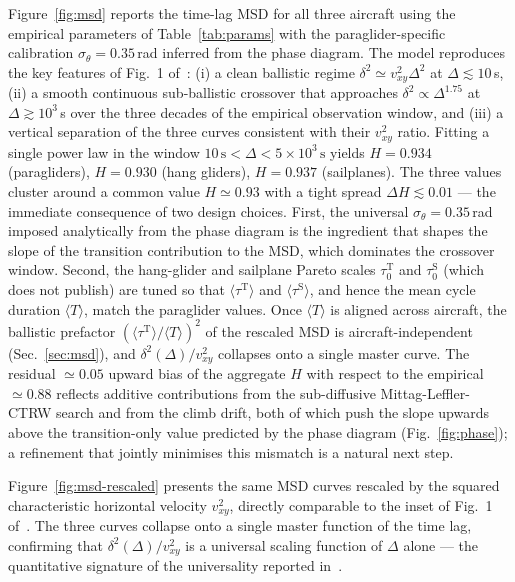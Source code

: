 \documentclass[11pt,a4paper]{article}
\begin{document}
Figure~\ref{fig:msd} reports the time-lag MSD for all three
aircraft using the empirical parameters of Table~\ref{tab:params}
with the paraglider-specific calibration $\sigma_\theta = 0.35$\,rad
inferred from the phase diagram. The model reproduces the key
features of Fig.~1 of~\cite{vilpellet2026}: (i) a clean ballistic
regime $\delta^2 \simeq v_{xy}^2\Delta^2$ at $\Delta \lesssim
10$\,s, (ii) a smooth continuous sub-ballistic crossover that
approaches $\delta^2 \propto \Delta^{1.75}$ at $\Delta \gtrsim
10^3$\,s over the three decades of the empirical observation
window, and (iii) a vertical separation of the three curves
consistent with their $v_{xy}^2$ ratio. Fitting a single power law
in the window $10\,\mathrm{s} < \Delta < 5 \times 10^3\,\mathrm{s}$
yields $H = 0.934$ (paragliders), $H = 0.930$ (hang gliders),
$H = 0.937$ (sailplanes). The three values cluster around a
common value $H \simeq 0.93$ with a tight spread $\Delta H
\lesssim 0.01$ --- the immediate consequence of two design
choices. First, the universal $\sigma_\theta = 0.35$\,rad
imposed analytically from the phase diagram is the ingredient
that shapes the slope of the transition contribution to the
MSD, which dominates the crossover window. Second, the
hang-glider and sailplane Pareto scales $\tau_0^{\mathrm{T}}$
and $\tau_0^{\mathrm{S}}$ (which~\cite{vilpellet2026} does not
publish) are tuned so that $\langle\tau^{\mathrm{T}}\rangle$
and $\langle\tau^{\mathrm{S}}\rangle$, and hence the mean cycle
duration $\langle T\rangle$, match the paraglider values. Once
$\langle T\rangle$ is aligned across aircraft, the ballistic
prefactor $(\langle\tau^{\mathrm{T}}\rangle/\langle T\rangle)^2$
of the rescaled MSD is aircraft-independent (Sec.~\ref{sec:msd}),
and $\delta^2(\Delta)/v_{xy}^2$ collapses onto a single master
curve. The residual $\simeq 0.05$ upward bias of the aggregate
$H$ with respect to the empirical $\simeq 0.88$ reflects
additive contributions from the sub-diffusive
Mittag-Leffler-CTRW search and from the climb drift, both of
which push the slope upwards above the transition-only value
predicted by the phase diagram (Fig.~\ref{fig:phase}); a
refinement that jointly minimises this mismatch is a natural
next step.

Figure~\ref{fig:msd-rescaled} presents the same MSD curves
rescaled by the squared characteristic horizontal velocity
$v_{xy}^2$, directly comparable to the inset of Fig.~1
of~\cite{vilpellet2026}. The three curves collapse onto a single
master function of the time lag, confirming that
$\delta^2(\Delta)/v_{xy}^2$ is a universal scaling function of
$\Delta$ alone --- the quantitative signature of the universality
reported in~\cite{vilpellet2026}.
\end{document}
